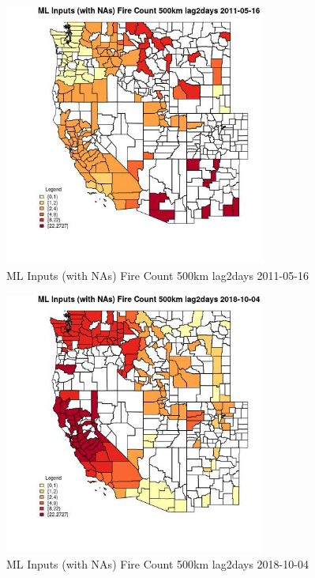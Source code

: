 \begin{figure} 
\centering  
\includegraphics[width=0.77\textwidth]{Code_Outputs/Report_ML_input_PM25_Step4_part_f_de_duplicated_aves_prioritize_24hr_obswNAs_CountyFire_Count_500km_lag2daysMean2011-05-16.jpg} 
\caption{\label{fig:Report_ML_input_PM25_Step4_part_f_de_duplicated_aves_prioritize_24hr_obswNAsCountyFire_Count_500km_lag2daysMean2011-05-16}ML Inputs (with NAs) Fire Count 500km lag2days 2011-05-16} 
\end{figure} 
 

\clearpage 

\begin{figure} 
\centering  
\includegraphics[width=0.77\textwidth]{Code_Outputs/Report_ML_input_PM25_Step4_part_f_de_duplicated_aves_prioritize_24hr_obswNAs_CountyFire_Count_500km_lag2daysMean2018-10-04.jpg} 
\caption{\label{fig:Report_ML_input_PM25_Step4_part_f_de_duplicated_aves_prioritize_24hr_obswNAsCountyFire_Count_500km_lag2daysMean2018-10-04}ML Inputs (with NAs) Fire Count 500km lag2days 2018-10-04} 
\end{figure} 
 

